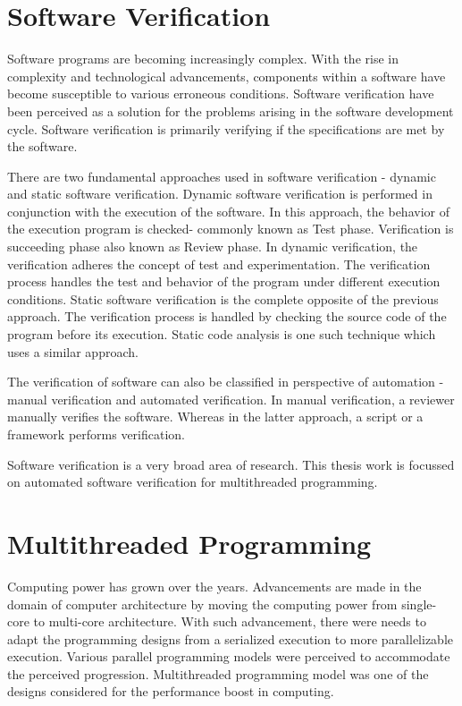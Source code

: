 \section{Software Verification}

Software programs are becoming increasingly complex. 
With the rise in complexity and technological advancements, components within a software have become susceptible to various erroneous conditions. 
Software verification have been perceived as a solution for the problems arising in the software development cycle. 
Software verification is primarily verifying if the specifications are met by the software\cite{ghezzi2002fundamentals}.

There are two fundamental approaches used in software verification - dynamic and static software verification\cite{ghezzi2002fundamentals}. 
Dynamic software verification is performed in conjunction with the execution of the software. 
In this approach, the behavior of the execution program is checked- commonly known as Test phase. 
Verification is succeeding phase also known as Review phase. 
In dynamic verification, the verification adheres the concept of test and experimentation. 
The verification process handles the test and behavior of the program under different execution conditions. 
Static software verification is the complete opposite of the previous approach. 
The verification process is handled by checking the source code of the program before its execution. 
Static code analysis is one such technique which uses a similar approach. 

The verification of software can also be classified in perspective of automation - manual verification and automated verification. 
In manual verification, a reviewer manually verifies the software. 
Whereas in the latter approach, a script or a framework performs  verification. 

Software verification is a very broad area of research. 
This thesis work is focussed on automated software verification for multithreaded programming. 

\section{Multithreaded Programming}

Computing power has grown over the years. 
Advancements are made in the domain of computer architecture by moving the computing power from single-core to multi-core architecture. 
With such advancement, there were needs to adapt the programming designs from a serialized execution to more parallelizable execution. 
Various parallel programming models were perceived to accommodate the perceived progression. 
Multithreaded programming model was one of the designs considered for the performance boost in computing\cite{carver2005modern}. 

